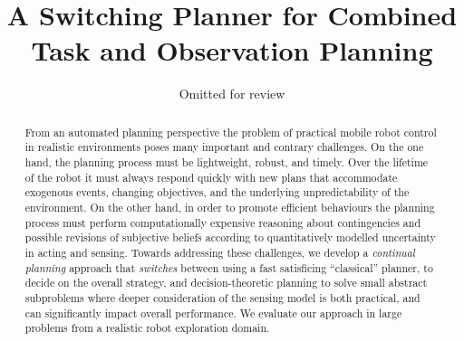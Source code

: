 \documentclass{article}
\title{A Switching Planner for Combined Task and Observation Planning}
\author{Omitted for review}
\begin{document}
 
\maketitle

\begin{abstract}


From an automated planning perspective the problem of practical mobile
robot control in realistic environments poses many important and
contrary challenges.  On the one hand, the planning process must be
lightweight, robust, and timely. Over the lifetime of the robot it
must always respond quickly with new plans that accommodate exogenous
events, changing objectives, and the underlying unpredictability of
the environment.  On the other hand, in order to promote efficient
behaviours the planning process must perform computationally expensive
reasoning about contingencies and possible revisions of subjective
beliefs according to quantitatively modelled uncertainty in acting and
sensing.
Towards addressing these challenges, we develop a \emph{continual
planning} approach that {\em switches} between using a fast
satisficing ``classical'' planner, to decide on the overall strategy,
and decision-theoretic planning to solve small abstract subproblems where
deeper consideration of the sensing model is both practical, and can
significantly impact overall performance. We evaluate our approach
in large problems from a realistic robot exploration domain.






\end{abstract}

\end{document}
